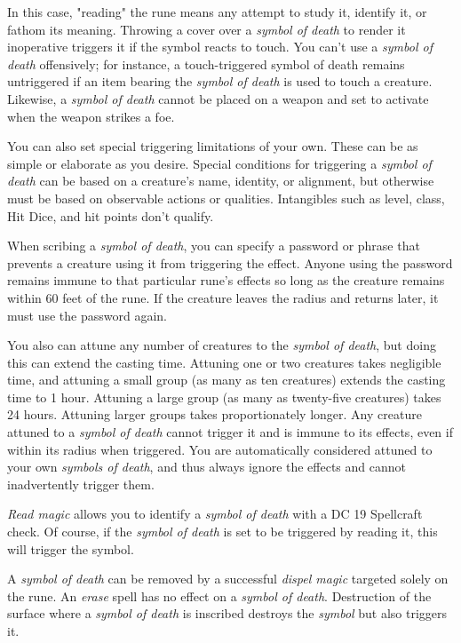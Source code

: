 In this case, "reading" the rune means any attempt to study it, identify it, 
or fathom its meaning. Throwing a cover over a \textit{symbol of death} to render 
it inoperative triggers it if the symbol reacts to touch. You can't use a \textit{symbol 
of death} offensively; for instance, a touch-triggered symbol of death remains 
untriggered if an item bearing the \textit{symbol of death} is used to touch a 
creature. Likewise, a \textit{symbol of death} cannot be placed on a weapon and 
set to activate when the weapon strikes a foe.

You can also set special triggering limitations of your own. These can be as simple 
or elaborate as you desire. Special conditions for triggering a \textit{symbol 
of death} can be based on a creature's name, identity, or alignment, but otherwise 
must be based on observable actions or qualities. Intangibles such as level, class, 
Hit Dice, and hit points don't qualify. 

When scribing a \textit{symbol of death}, you can specify a password or phrase 
that prevents a creature using it from triggering the effect. Anyone using 
the password remains immune to that particular rune's effects so long as the creature 
remains within 60 feet of the rune. If the creature leaves the radius and returns 
later, it must use the password again.

You also can attune any number of creatures to the \textit{symbol of death}, but 
doing this can extend the casting time. Attuning one or two creatures takes negligible 
time, and attuning a small group (as many as ten creatures) extends the casting 
time to 1 hour. Attuning a large group (as many as twenty-five creatures) takes 
24 hours. Attuning larger groups takes proportionately longer. Any creature attuned 
to a \textit{symbol of death} cannot trigger it and is immune to its effects, even 
if within its radius when triggered. You are automatically considered attuned to 
your own \textit{symbols of death}, and thus always ignore the effects and cannot 
inadvertently trigger them.

\textit{Read magic} allows you to identify a \textit{symbol of death} with a DC 
19 Spellcraft check. Of course, if the \textit{symbol of death} is set to be triggered 
by reading it, this will trigger the symbol.

A \textit{symbol of death} can be removed by a successful \textit{dispel magic 
}targeted solely on the rune. An \textit{erase} spell has no effect on a \textit{symbol 
of death}. Destruction of the surface where a \textit{symbol of death} is inscribed 
destroys the \textit{symbol} but also triggers it.

